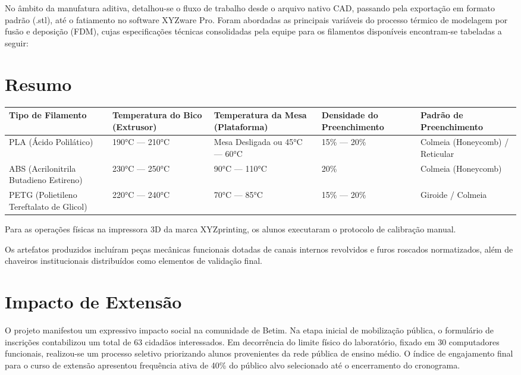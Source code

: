 \documentclass[12pt,a4paper]{article}
\begin{document}
No âmbito da manufatura aditiva, detalhou-se o fluxo de trabalho desde o arquivo nativo CAD, passando pela exportação em formato padrão (.stl), até o fatiamento no software XYZware Pro. Foram abordadas as principais variáveis do processo térmico de modelagem por fusão e deposição (FDM), cujas especificações técnicas consolidadas pela equipe para os filamentos disponíveis encontram-se tabeladas a seguir:

\section{Resumo}

\begin{longtable}{|p{3.2cm}|p{2.2cm}|p{2.2cm}|p{2.2cm}|p{3.5cm}|}
\toprule
Tipo de Filamento & Temperatura do Bico (Extrusor) & Temperatura da Mesa (Plataforma) & Densidade do Preenchimento & Padrão de Preenchimento \\
\midrule
PLA	(Ácido Polilático) & 190°C — 210°C & Mesa Desligada ou 45°C — 60°C & 15\% — 20\% & Colmeia (Honeycomb) / Reticular \\ \hline

ABS	(Acrilonitrila Butadieno Estireno) & 230°C — 250°C & 90°C — 110°C & 20\% & Colmeia (Honeycomb) \\ \hline

PETG (Polietileno Tereftalato de Glicol) & 220°C — 240°C & 70°C — 85°C & 15\% — 20\% & Giroide / Colmeia \\ \hline

\bottomrule
\end{longtable}

Para as operações físicas na impressora 3D da marca XYZprinting, os alunos executaram o protocolo de calibração manual.

Os artefatos produzidos incluíram peças mecânicas funcionais dotadas de canais internos revolvidos e furos roscados normatizados, além de chaveiros institucionais distribuídos como elementos de validação final.

\section{Impacto de Extensão}
O projeto manifestou um expressivo impacto social na comunidade de Betim. Na etapa inicial de mobilização pública, o formulário de inscrições contabilizou um total de 63 cidadãos interessados. Em decorrência do limite físico do laboratório, fixado em 30 computadores funcionais, realizou-se um processo seletivo priorizando alunos provenientes da rede pública de ensino médio. O índice de engajamento final para o curso de extensão apresentou frequência ativa de 40\% do público alvo selecionado até o encerramento do cronograma.
\end{document}
